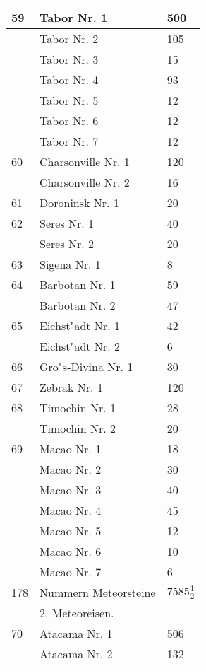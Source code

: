 \documentclass[a4paper, 11pt, oneside, polutonikogreek, german]{article}
\begin{document}
\begin{center}
\begin{longtable}{|l|l|l|}
        59 & Tabor Nr. 1 & 500 \\ \hline
          & Tabor Nr. 2 & 105 \\ \hline
          & Tabor Nr. 3 & 15 \\ \hline
          & Tabor Nr. 4 & 93 \\ \hline
          & Tabor Nr. 5 & 12 \\ \hline
          & Tabor Nr. 6 & 12 \\ \hline
          & Tabor Nr. 7 & 12 \\ \hline
        60 & Charsonville Nr. 1 & 120 \\ \hline
          & Charsonville Nr. 2 & 16 \\ \hline
        61 & Doroninsk Nr. 1 & 20 \\ \hline
        62 & Seres Nr. 1 & 40 \\ \hline
          & Seres Nr. 2 & 20 \\ \hline
        63 & Sigena Nr. 1 & 8 \\ \hline
        64 & Barbotan Nr. 1 & 59 \\ \hline
          & Barbotan Nr. 2 & 47 \\ \hline
        65 & Eichst"adt Nr. 1 & 42 \\ \hline
          & Eichst"adt Nr. 2 & 6 \\ \hline
        66 & Gro"s-Divina Nr. 1 & 30 \\ \hline
        67 & Zebrak Nr. 1 & 120 \\ \hline
        68 & Timochin Nr. 1 & 28 \\ \hline
          & Timochin Nr. 2 & 20 \\ \hline
        69 & Macao Nr. 1 & 18 \\ \hline
          & Macao Nr. 2 & 30 \\ \hline
          & Macao Nr. 3 & 40 \\ \hline
          & Macao Nr. 4 & 45 \\ \hline
          & Macao Nr. 5 & 12 \\ \hline
          & Macao Nr. 6 & 10 \\ \hline
          & Macao Nr. 7 & 6 \\ \hline
        178 & Nummern Meteorsteine & $7585\frac{1}{2}$ \\ \hline
          & 2. Meteoreisen. &   \\ \hline
        70 & Atacama Nr. 1 & 506 \\ \hline
          & Atacama Nr. 2 & 132 \\ \hline

\end{longtable}
\end{center}
\end{document}
